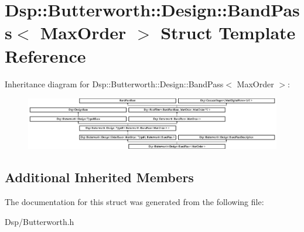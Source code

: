 \hypertarget{structDsp_1_1Butterworth_1_1Design_1_1BandPass}{\section{Dsp\-:\-:Butterworth\-:\-:Design\-:\-:Band\-Pass$<$ Max\-Order $>$ Struct Template Reference}
\label{structDsp_1_1Butterworth_1_1Design_1_1BandPass}
}
Inheritance diagram for Dsp\-:\-:Butterworth\-:\-:Design\-:\-:Band\-Pass$<$ Max\-Order $>$\-:\begin{figure}[H]
\begin{center}
\leavevmode
\includegraphics[height=2.309278cm]{structDsp_1_1Butterworth_1_1Design_1_1BandPass}
\end{center}
\end{figure}
\subsection*{Additional Inherited Members}


The documentation for this struct was generated from the following file\-:\begin{DoxyCompactItemize}
\item 
Dsp/Butterworth.\-h\end{DoxyCompactItemize}
